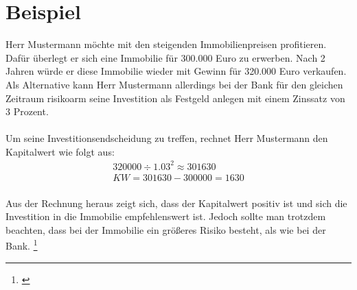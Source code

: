 \section{Beispiel}
Herr Mustermann möchte mit den steigenden Immobilienpreisen profitieren. Dafür überlegt er sich eine Immobilie für 300.000 Euro zu erwerben. Nach 2 Jahren würde er diese Immobilie wieder mit Gewinn für 320.000 Euro verkaufen. Als Alternative kann Herr Mustermann allerdings bei der Bank für den gleichen Zeitraum risikoarm seine Investition als Festgeld anlegen mit einem Zinssatz von 3 Prozent.\\ \\
Um seine Investitionsendscheidung zu treffen, rechnet Herr Mustermann den Kapitalwert wie folgt aus:\\

\begin{align*}
    320000 \div 1.03^2 \approx 301630 \\
    KW = 301630 - 300000 = 1630
\end{align*}
\\
Aus der Rechnung heraus zeigt sich, dass der Kapitalwert positiv ist und sich die Investition in die Immobilie empfehlenswert ist. Jedoch sollte man trotzdem beachten, dass bei der Immobilie ein größeres Risiko besteht, als wie bei der Bank.
\footnote{\cite{welt-der-bwl-kapitalwertmethode}}
